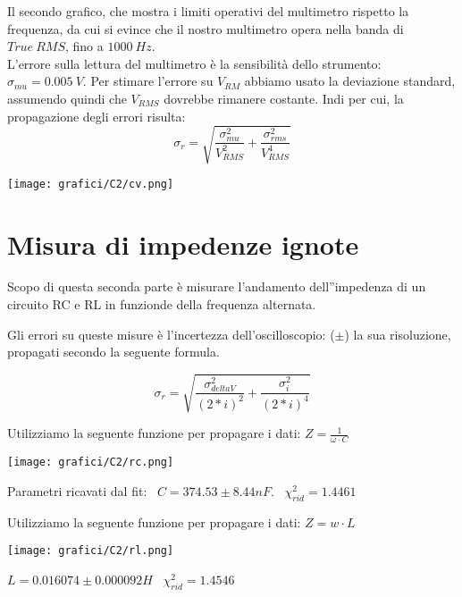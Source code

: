 Il secondo grafico, che mostra i limiti operativi del multimetro rispetto la frequenza, da cui si evince che il nostro multimetro opera nella banda di $True\ RMS$, fino a  $1000\ Hz$.    \\
L'errore sulla lettura del multimetro è la sensibilità dello strumento: $\sigma_{mu} = 0.005\ V$. Per stimare l'errore su $V_{RM}$ abbiamo usato la deviazione standard, assumendo quindi che $V_{RMS}$ dovrebbe rimanere costante. 
Indi per cui, la propagazione degli errori risulta:
$$\sigma_r = \sqrt{\frac{\sigma_{mu}^2}{V_{RMS}^2} + \frac{\sigma_{rms}^2}{V_{RMS}^4}}$$

\begin{center}
\texttt{[image: grafici/C2/cv.png]} 
\end{center}




%
%
%
%
%

\section{Misura di impedenze ignote}

Scopo di questa seconda parte è misurare l'andamento dell''impedenza di un circuito RC e RL in funzionde della frequenza alternata.

Gli errori su queste misure è l'incertezza dell'oscilloscopio: ($\pm$) la sua risoluzione, propagati secondo la seguente formula.

$$\sigma_r = \sqrt{\frac{\sigma_{deltaV}^2}{(2*i)^2} + \frac{\sigma_{i}^2}{(2*i)^4}}$$


Utilizziamo la seguente funzione per propagare i dati:
$Z = \frac{1}{\omega \cdot C}$

\begin{center}
\texttt{[image: grafici/C2/rc.png]} 
\end{center}
Parametri ricavati dal fit:
\
$C = 374.53\pm 8.44 nF$.
\
$\chi_{rid}^2= 1.4461 $ 


Utilizziamo la seguente funzione per propagare i dati:
$Z = w\cdot L$

\begin{center}
\texttt{[image: grafici/C2/rl.png]} 
\end{center}

$L = 0.016074\pm 0.000092 H$ \
$\chi_{rid}^2 = 1.4546$ 




